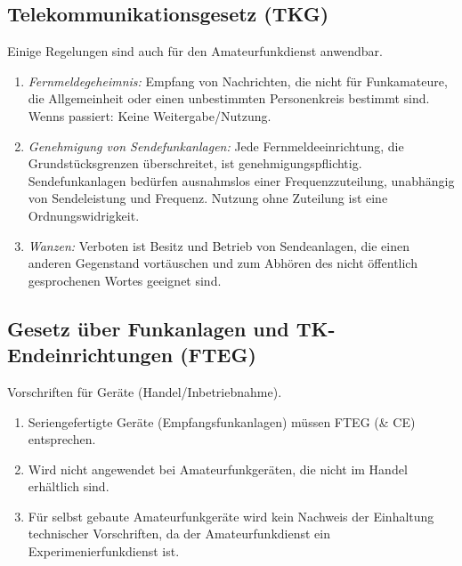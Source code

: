 \documentclass[11pt,BCOR=8.5mm]{scrartcl}
\begin{document}
\subsection{Telekommunikationsgesetz (TKG)}\label{sub:telekommunikationsgesetz}
 Einige Regelungen sind auch für den
Amateurfunkdienst anwendbar.
\begin{enumerate}
  \item \emph{Fernmeldegeheimnis:} Empfang von Nachrichten, die nicht für
	Funkamateure, die Allgemeinheit oder einen unbestimmten
	Personenkreis bestimmt sind. Wenns passiert: Keine
	Weitergabe/Nutzung.
  \item \emph{Genehmigung von Sendefunkanlagen:} Jede
	Fernmeldeeinrichtung, die Grundstücksgrenzen überschreitet, ist
	genehmigungspflichtig. Sendefunkanlagen bedürfen ausnahmslos einer
	Frequenzzuteilung, unabhängig von Sendeleistung und Frequenz.
	Nutzung ohne Zuteilung ist eine Ordnungswidrigkeit.
  \item \emph{Wanzen:} Verboten ist Besitz und Betrieb von Sendeanlagen, die einen
	anderen Gegenstand vortäuschen und zum Abhören des nicht öffentlich
	gesprochenen Wortes geeignet sind.
\end{enumerate}

\subsection{Gesetz über Funkanlagen und
TK-Endeinrichtungen (FTEG)}\label{sub:elekommunikationsendeinrichtungen}
Vorschriften für Geräte (Handel/Inbetriebnahme).
\begin{enumerate}
  \item Seriengefertigte Geräte (Empfangsfunkanlagen) müssen FTEG (\& CE) entsprechen.
  \item Wird nicht angewendet bei Amateurfunkgeräten, die nicht im
	Handel erhältlich sind.
  \item Für selbst gebaute Amateurfunkgeräte wird kein Nachweis der
	Einhaltung technischer Vorschriften, da der Amateurfunkdienst ein
	Experimenierfunkdienst ist.
\end{enumerate}
\end{document}

